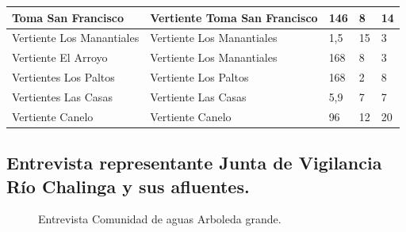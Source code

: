 \documentclass[]{article}
\begin{document}
\begin{longtable}{|p{4cm}|p{3cm}|p{2cm}|p{2.5cm}|p{2cm}|}
	Toma San Francisco					& Vertiente Toma San Francisco 	& 146 	 & 8 	& 14 	\\ \hline
	Vertiente Los Manantiales			& Vertiente Los Manantiales & 1,5 	 & 15 	 & 3 	\\ \hline
	Vertiente El Arroyo					& Vertiente Los Manantiales & 168 	 & 8 	 & 3 	\\ \hline
	Vertientes Los Paltos				& Vertiente Los Paltos		& 168 	 & 2 	 & 8 	\\ \hline
	Vertientes Las Casas				& Vertiente Las Casas		& 5,9 	 & 7 	 & 7 	\\ \hline
	Vertiente Canelo					& Vertiente Canelo			& 96 	 & 12 	 & 20 	\\ \hline
    \end{longtable}

\newpage
\subsection{Entrevista representante Junta de Vigilancia Río Chalinga y sus afluentes.} \label{Entrevista OUA's}

\begin{figure} [H]
	\caption{Entrevista Comunidad de aguas Arboleda grande.}
\end{figure}
\clearpage
\end{document}
